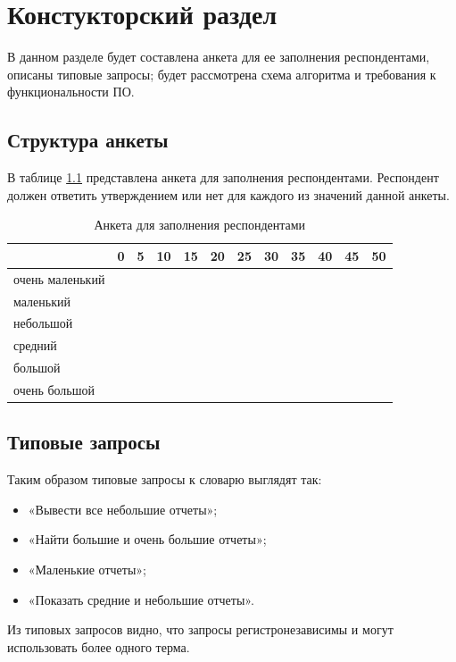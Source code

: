 \chapter{ Констукторский раздел}
\label{cha:design}
    В данном разделе будет составлена анкета для ее заполнения респондентами, описаны типовые запросы; будет рассмотрена схема алгоритма и требования к функциональности ПО.
    
    \section{Структура анкеты}
    \par В таблице \ref{tab:anket1} представлена анкета для заполнения респондентами. Респондент должен ответить утверждением или нет для каждого из значений данной анкеты. 
    \begin{table}[!h]
    \centering
    \caption{Анкета для заполнения респондентами}
\begin{tabular}{|l|l|l|l|l|l|l|l|l|l|l|l|}
\hline
                & 0 & 5 & 10 & 15 & 20 & 25 & 30 & 35 & 40 & 45 & 50 \\ \hline
очень маленький &   &   &    &    &    &    &    &    &    &    &    \\ \hline
маленький       &   &   &    &    &    &    &    &    &    &    &    \\ \hline
небольшой       &   &   &    &    &    &    &    &    &    &    &    \\ \hline
средний         &   &   &    &    &    &    &    &    &    &    &    \\ \hline
большой         &   &   &    &    &    &    &    &    &    &    &    \\ \hline
очень большой   &   &   &    &    &    &    &    &    &    &    &    \\ \hline
\end{tabular}
\label{tab:anket1}
\end{table}
    \section{Типовые запросы}
    \par Таким образом типовые запросы к словарю выглядят так:
    \begin{itemize}
        \item «Вывести все небольшие отчеты»;
        \item «Найти большие и очень большие отчеты»;
        \item «Маленькие отчеты»;
        \item «Показать средние и небольшие отчеты».
    \end{itemize}
    \par Из типовых запросов видно, что запросы регистронезависимы и могут использовать более одного терма.


